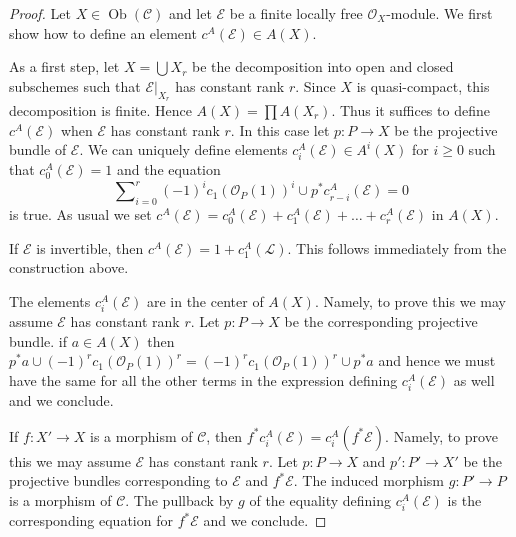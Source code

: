 \documentclass{stacks-project}
\theoremstyle{plain}
\theoremstyle{definition}
\theoremstyle{remark}
\numberwithin{equation}{subsection}
\def\Ob{\mathop{\mathrm{Ob}}\nolimits}
\begin{document}
\begin{proof}
Let $X \in \Ob(\mathcal{C})$ and let $\mathcal{E}$ be a finite
locally free $\mathcal{O}_X$-module. We first show how to define
an element $c^A(\mathcal{E}) \in A(X)$.

\medskip\noindent
As a first step, let $X = \bigcup X_r$ be the decomposition into
open and closed subschemes such that $\mathcal{E}|_{X_r}$ has
constant rank $r$. Since $X$ is quasi-compact, this decomposition
is finite. Hence $A(X) = \prod A(X_r)$. Thus it suffices to define
$c^A(\mathcal{E})$ when $\mathcal{E}$ has constant rank $r$. In this
case let $p : P \to X$ be the projective bundle of $\mathcal{E}$.
We can uniquely define elements $c_i^A(\mathcal{E}) \in A^i(X)$
for $i \geq 0$ such that $c_0^A(\mathcal{E}) = 1$ and the equation
\begin{equation}
\label{equation-chern-classes}
\sum\nolimits_{i = 0}^r
(-1)^i c_1(\mathcal{O}_P(1))^i \cup p^*c^A_{r - i}(\mathcal{E})
= 0
\end{equation}
is true. As usual we set
$c^A(\mathcal{E}) = c_0^A(\mathcal{E}) + c_1^A(\mathcal{E}) + \ldots
+ c_r^A(\mathcal{E})$ in $A(X)$.

\medskip\noindent
If $\mathcal{E}$ is invertible, then
$c^A(\mathcal{E}) = 1 + c_1^A(\mathcal{L})$.
This follows immediately from the construction above.

\medskip\noindent
The elements $c_i^A(\mathcal{E})$ are in the center of $A(X)$.
Namely, to prove this we may assume $\mathcal{E}$ has constant rank $r$.
Let $p : P \to X$ be the corresponding projective bundle.
if $a \in A(X)$ then $p^*a \cup (-1)^r c_1(\mathcal{O}_P(1))^r =
(-1)^r c_1(\mathcal{O}_P(1))^r \cup p^*a$ and hence we must have the same
for all the other terms in the expression defining $c_i^A(\mathcal{E})$
as well and we conclude.

\medskip\noindent
If $f : X' \to X$ is a morphism of $\mathcal{C}$, then
$f^*c_i^A(\mathcal{E}) = c_i^A(f^*\mathcal{E})$.
Namely, to prove this we may assume $\mathcal{E}$ has constant rank $r$.
Let $p : P \to X$ and $p' : P' \to X'$ be the projective
bundles corresponding to $\mathcal{E}$ and $f^*\mathcal{E}$.
The induced morphism $g : P' \to P$ is a morphism of $\mathcal{C}$.
The pullback by $g$ of the equality defining $c_i^A(\mathcal{E})$
is the corresponding equation for $f^*\mathcal{E}$ and we conclude.


\end{proof}
\end{document}
